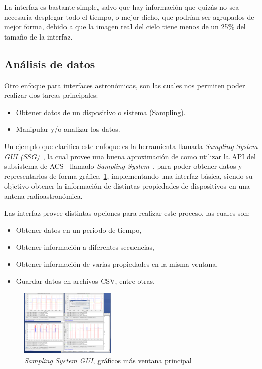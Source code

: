 La interfaz es bastante simple,
salvo que hay información que quizás no sea necesaria
desplegar todo el tiempo, o mejor dicho,
que podrían ser agrupados de mejor forma,
debido a que la imagen real del cielo tiene
menos de un 25\% del tamaño de la interfaz.

\subsection{Análisis de datos}

Otro enfoque para interfaces astronómicas, son las cuales nos permiten
poder realizar dos tareas
principales:
\begin{itemize}
    \item Obtener datos de un dispositivo o sistema (Sampling).
    \item Manipular y/o analizar los datos.
\end{itemize}

Un ejemplo que clarifica este enfoque es la herramienta llamada
\emph{Sampling System GUI (SSG)}~\cite{ssg}, la cual provee una buena
aproximación de como utilizar la API del subsistema de ACS~\cite{acs} llamado
\emph{Sampling System}~\cite{acssamp}, para poder obtener datos y
representarlos de forma gráfica~\ref{fig:ssg}, implementando una interfaz básica,
siendo su objetivo obtener la información de distintas propiedades
de dispositivos en una antena radioastronómica.

Las interfaz provee distintas opciones para realizar este proceso,
las cuales son:
\begin{itemize}
    \item Obtener datos en un periodo de tiempo,
    \item Obtener información a diferentes secuencias,
    \item Obtener información de varias propiedades en la misma ventana,
    \item Guardar datos en archivos CSV, entre otras.
\end{itemize}

\begin{figure}[!htb]
    \centering
    \includegraphics[width=0.4\textwidth]{img/ssg}
    \caption{\emph{Sampling System GUI}, gráficos más ventana principal}
    \label{fig:ssg}
\end{figure}

